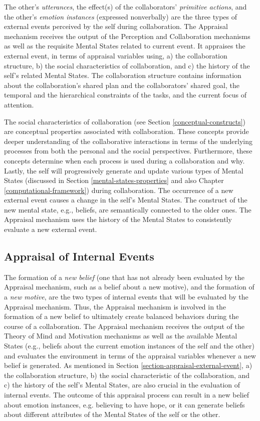 \documentclass[letterpaper]{article}
\begin{document}
The other's \textit{utterances}, the effect(s) of the collaborators'
\textit{primitive actions}, and the other's \textit{emotion instances}
(expressed nonverbally) are the three types of external events perceived by the
self during collaboration. The Appraisal mechanism receives the output of the
Perception and Collaboration mechanisms as well as the requisite Mental States
related to current event. It appraises the external event, in terms of appraisal
variables using, a) the collaboration structure, b) the social characteristics
of collaboration, and c) the history of the self's related Mental States. The
collaboration structure contains information about the collaboration's shared
plan and the collaborators' shared goal, the temporal and the hierarchical
constraints of the tasks, and the current focus of attention. 

The social characteristics of collaboration (see Section
\ref{conceptual-constructs}) are conceptual properties associated with
collaboration. These concepts provide deeper understanding of the collaborative
interactions in terms of the underlying processes from both the personal and the
social perspectives. Furthermore, these concepts determine when each process
is used during a collaboration and why. Lastly, the self will progressively
generate and update various types of Mental States (discussed in Section
\ref{mental-states-properties} and also Chapter \ref{computational-framework})
during collaboration. The occurrence of a new external event causes a change in
the self's Mental States. The construct of the new mental state, e.g., beliefs,
are semantically connected to the older ones. The Appraisal mechanism uses the
history of the Mental States to consistently evaluate a new external event.

\subsection{Appraisal of Internal Events}

The formation of a \textit{new belief} (one that has not already been evaluated
by the Appraisal mechanism, such as a belief about a new motive), and the
formation of a \textit{new motive}, are the two types of internal events that
will be evaluated by the Appraisal mechanism. Thus, the Appraisal mechanism is
involved in the formation of a new belief to ultimately create balanced
behaviors during the course of a collaboration. The Appraisal mechanism receives
the output of the Theory of Mind and Motivation mechanisms as well as the
available Mental States (e.g., beliefs about the current emotion instances of
the self and the other) and evaluates the environment in terms of the appraisal
variables whenever a new belief is generated. As mentioned in Section
\ref{section-appraisal-external-event}, a) the collaboration structure, b) the
social characteristic of the collaboration, and c) the history of the self's
Mental States, are also crucial in the evaluation of internal events. The
outcome of this appraisal process can result in a new belief about emotion
instances, e.g. believing to have hope, or it can generate beliefs about
different attributes of the Mental States of the self or the other.
\end{document}
